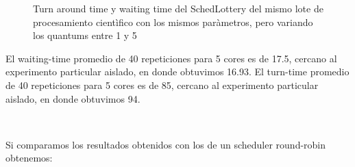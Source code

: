 \begin{figure}
\hfill
{}
\hfill
{}
\hfill
\caption{Turn around time y waiting time del SchedLottery del mismo lote de procesamiento cientìfico con los mismos paràmetros,
	pero variando los quantums entre 1 y 5}
\end{figure}

El waiting-time promedio de 40 repeticiones para 5 cores es de 17.5, cercano al experimento particular aislado, en donde obtuvimos 16.93.
El turn-time promedio de 40 repeticiones para 5 cores es de 85, cercano al experimento particular aislado, en donde obtuvimos 94.

~

Si comparamos los resultados obtenidos con los de un scheduler round-robin obtenemos:

